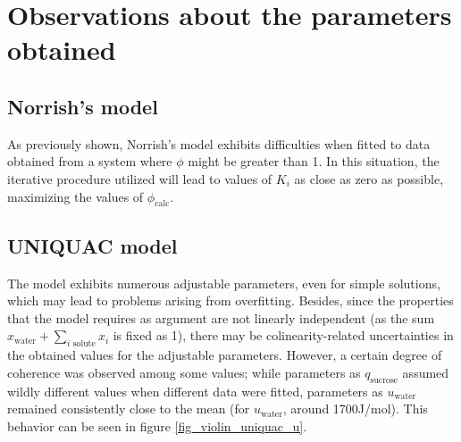 \section{Observations about the parameters obtained}

\subsection{Norrish's model}

As previously shown, Norrish's model exhibits difficulties when fitted to data
obtained from a system where $\phi$ might be greater than 1. In this situation,
the iterative procedure utilized will lead to values of $K_i$ as close as zero as
possible, maximizing the values of $\phi_\text{calc}$.

\subsection{UNIQUAC model}

The model exhibits numerous adjustable parameters, even for simple
solutions, which may lead to problems arising from overfitting. Besides, since
the properties that the model requires as argument are not linearly independent
(as the sum $x_\text{water} + \sum_{i\text{ solute}}x_i$ is fixed as 1), there
may be colinearity-related uncertainties in the obtained values for the adjustable
parameters. However, a certain degree of coherence was observed among some values;
while parameters as $q_\text{sucrose}$ assumed wildly different values when different
data were fitted, parameters as $u_\text{water}$ remained consistently close
to the mean (for $u_\text{water}$, around 1700J/mol). This behavior can be
seen in figure \ref{fig_violin_uniquac_u}.

